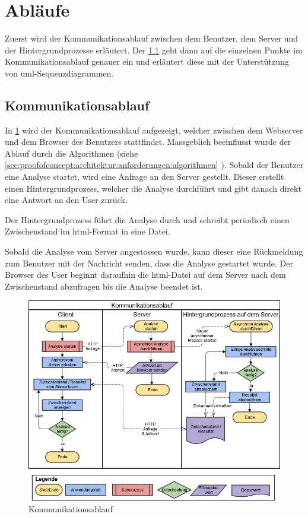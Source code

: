 \section{Abläufe}
Zuerst wird der Kommunikationsablauf zwischen dem Benutzer, dem Server und der Hintergrundprozesse erläutert. Der \cref{sec:proofofconcept:kommunikationsablauf} geht dann auf die einzelnen Punkte im Kommunikationsablauf genauer ein und erläutert diese mit der Unterstützung von \gls{uml}-Sequenzdiagrammen.

\subsection{Kommunikationsablauf}
\label{sec:proofofconcept:kommunikationsablauf}
In \cref{fig:proofofconcept:kommunikationsablauf:1} wird der Kommunikationsablauf aufgezeigt, welcher zwischen dem Webserver und dem Browser des Benutzers stattfindet. Massgeblich beeinflusst wurde der Ablauf durch die Algorithmen (siehe \cref{sec:proofofconcept:architektur:anforderungen:algorithmen} ). Sobald der Benutzer eine Analyse startet, wird eine Anfrage an den Server gestellt. Dieser erstellt einen Hintergrundprozess, welcher die Analyse durchführt und gibt danach direkt eine Antwort an den User zurück. 

Der Hintergrundprozess führt die Analyse durch und schreibt periodisch einen Zwischenstand im \gls{html}-Format in eine Datei.

Sobald die Analyse vom Server angestossen wurde, kann dieser eine Rückmeldung zum Benutzer mit der Nachricht senden, dass die Analyse gestartet wurde. Der Browser des User beginnt daraufhin die \gls{html}-Datei auf dem Server nach dem Zwischenstand abzufragen bis die Analyse beendet ist.
\begin{figure}[H]
	\RawFloats
	\centering
	\includegraphics[width=1\textwidth]{images/diagram-communication-flow}
	\caption{Kommunikationsablauf}
	\label{fig:proofofconcept:kommunikationsablauf:1}
\end{figure}



